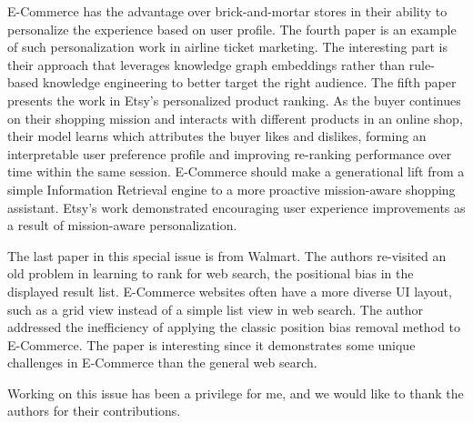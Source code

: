 \documentclass[11pt]{article}
\begin{document}
E-Commerce has the advantage over brick-and-mortar stores in their ability to personalize the experience based on user profile. The fourth paper is an example of such personalization work in airline ticket marketing. The interesting part is their approach that leverages knowledge graph embeddings rather than rule-based knowledge engineering to better target the right audience. The fifth paper presents the work in Etsy's personalized product ranking. As the buyer continues on their shopping mission and interacts with different products in an online shop, their model learns which attributes the buyer likes and dislikes, forming an interpretable user preference profile and improving re-ranking performance over time within the same session. E-Commerce should make a generational lift from a simple Information Retrieval engine to a more proactive mission-aware shopping assistant. Etsy's work demonstrated encouraging user experience improvements as a result of mission-aware personalization. 


The last paper in this special issue is from Walmart. The authors re-visited an old problem in learning to rank for web search, the positional bias in the displayed result list. E-Commerce websites often have a more diverse UI layout, such as a grid view instead of a simple list view in web search. The author addressed the inefficiency of applying the classic position bias removal method to E-Commerce. The paper is interesting since it demonstrates some unique challenges in E-Commerce than the general web search.

Working on this issue has been a privilege for me, and we would like to thank the authors for their contributions. %
\end{document}
